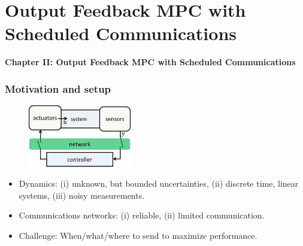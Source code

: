 \documentclass{beamer}
\begin{document}
\section{Output Feedback MPC with Scheduled Communications}
\begin{frame}
\centerline{\textbf{Chapter II: Output Feedback MPC with Scheduled Communications}
}
\end{frame}
\begin{frame}
 \frametitle{Motivation and setup}
 \begin{figure}
\centering
\includegraphics[width=0.4\textwidth ]{clc.png}
\end{figure}
 \begin{itemize}
  \item Dynamics: (i) unknown, but bounded uncertainties, (ii) discrete time, linear systems, (iii) noisy measurements.
  \item Communications networks: (i) reliable, (ii) limited communication. %
  \item Challenge: When/what/where to send to maximize  performance.
 \end{itemize}
\end{frame}
\end{document}
